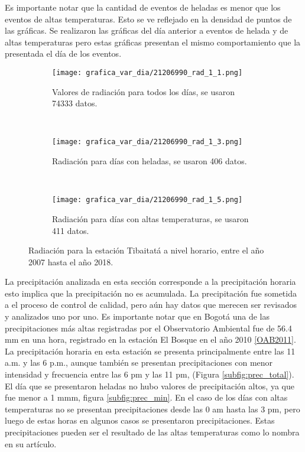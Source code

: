 Es importante notar que la cantidad de eventos de heladas es menor que los eventos de altas temperaturas. Esto se ve reflejado en la densidad de puntos de las gráficas. Se realizaron las gráficas del día anterior a eventos de helada y de altas temperaturas pero estas gráficas presentan el mismo comportamiento que la presentada el día de los eventos.\\

\begin{figure}[H]
    \centering
    \begin{subfigure}[b]{0.45\textwidth}
    \caption{Valores de radiación para todos los días, se usaron 74333 datos.}
	\texttt{[image: grafica\_var\_dia/21206990\_rad\_1\_1.png]}
    \label{subfig:rad_total}
	\end{subfigure}
	~
    \begin{subfigure}[b]{0.45\textwidth}
    \caption{Radiación para días con heladas, se usaron 406 datos.}
	\texttt{[image: grafica\_var\_dia/21206990\_rad\_1\_3.png]}
    \label{subfig:rad_min}
	\end{subfigure}
		~
    \begin{subfigure}[b]{0.45\textwidth}
    \caption{Radiación para días con altas temperaturas, se usaron 411 datos.}
	\texttt{[image: grafica\_var\_dia/21206990\_rad\_1\_5.png]}
    \label{subfig:rad_max}
	\end{subfigure}
	
	\caption{Radiación para la estación Tibaitatá a nivel horario, entre el año 2007 hasta el año 2018.}
    \label{fig:rad_tibaitata}
\end{figure}


La precipitación analizada en esta sección corresponde a la precipitación horaria esto implica que la precipitación no es acumulada. La precipitación fue sometida a el proceso de control de calidad, pero aún hay datos que merecen ser revisados y analizados uno por uno. Es importante notar que en Bogotá una de las precipitaciones más altas registradas por el Observatorio Ambiental fue de 56.4 mm en una hora, registrado en la estación El Bosque en el año 2010 \ref{OAB2011}.\\

La precipitación horaria en esta estación se presenta principalmente entre las 11 a.m. y las 6 p.m., aunque también se presentan precipitaciones con menor intensidad y frecuencia entre las 6 pm y las 11 pm, (Figura \ref{subfig:prec_total}). El día que se presentaron heladas no hubo valores de precipitación altos, ya que fue menor a 1 mmm, figura \ref{subfig:prec_min}. En el caso de los días con altas temperaturas no se presentan precipitaciones desde las 0 am hasta las 3 pm, pero luego de estas horas en algunos casos se presentaron precipitaciones. Estas precipitaciones pueden ser el resultado de las altas temperaturas como lo nombra \citet{Fischer2015} en su artículo.

